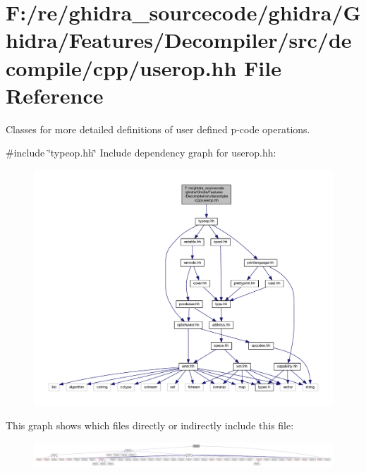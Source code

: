 \hypertarget{userop_8hh}{}\section{F\+:/re/ghidra\+\_\+sourcecode/ghidra/\+Ghidra/\+Features/\+Decompiler/src/decompile/cpp/userop.hh File Reference}
\label{userop_8hh}


Classes for more detailed definitions of user defined p-\/code operations.  


{\ttfamily \#include \char`\"{}typeop.\+hh\char`\"{}}\newline
Include dependency graph for userop.\+hh\+:
\nopagebreak
\begin{figure}[H]
\begin{center}
\leavevmode
\includegraphics[width=350pt]{userop_8hh__incl}
\end{center}
\end{figure}
This graph shows which files directly or indirectly include this file\+:
\nopagebreak
\begin{figure}[H]
\begin{center}
\leavevmode
\includegraphics[width=350pt]{userop_8hh__dep__incl}
\end{center}
\end{figure}
